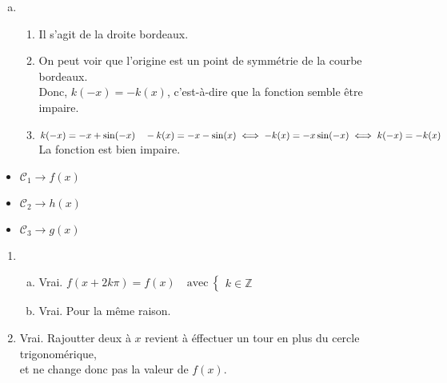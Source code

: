 \documentclass[12pt, a4paper]{article}
\begin{document}
\begin{Exercise}[number={81}]
\begin{enumerate}[a)]
\begin{enumerate}[1)]
                \end{enumerate}\smallbreak
        \item   \begin{enumerate}[1)]
                    \item Il s'agit de la droite bordeaux.
                    \item On peut voir que l'origine est un point de symmétrie de la courbe bordeaux. \\ Donc, $k(-x)=-k(x)$, c'est-à-dire que la fonction semble être impaire.
                    \item $k(-x)=-x+\sin(-x) \quad -k(x)=-x-\sin(x)\iff -k(x)=-x\sin(-x)\\\iff k(-x)=-k(x)$ \quad La fonction est bien impaire.
                \end{enumerate}
    \end{enumerate}
\end{Exercise}

\begin{Exercise}[number={82}]
    \begin{itemize}
        \item $\mathcal{C}_1\longrightarrow f(x)$
        \item $\mathcal{C}_2\longrightarrow h(x)$
        \item $\mathcal{C}_3\longrightarrow g(x)$
    \end{itemize}
\end{Exercise}

\begin{Exercise}[number={83}]
    \begin{enumerate}[1)]
        \item   \begin{enumerate}[a)]
                    \item Vrai. $f(x+2k\pi)=f(x)\quad\text{avec}\ \begin{cases}k\in\mathbb{Z}\end{cases}$
                    \item Vrai. Pour la même raison.
                \end{enumerate}
        \item Vrai. Rajoutter deux à $x$ revient à éffectuer un tour en plus du cercle trigonomérique,\\\phantom{Vrai.} et ne change donc pas la valeur de $f(x)$.
    \end{enumerate}
\end{Exercise}
\end{document}
